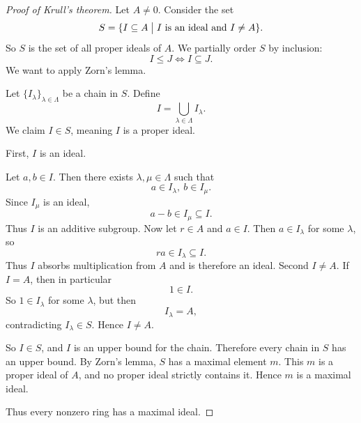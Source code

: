 \documentclass[11pt]{article}
\begin{document}
\begin{proof}[Proof of Krull's theorem]
    Let $A \neq 0$. Consider the set 
    \[
        S = \{I \subseteq A \bigm| I \ \text{is an ideal and} \ 
        I \neq A\}.
    \]
    So $S$ is the set of all proper ideals of $A$. 
    We partially order $S$ by inclusion: 
    \[
        I \leq J \Leftrightarrow I \subseteq J. 
    \]
    We want to apply Zorn's lemma. 

    Let $\{I_\lambda\}_{\lambda \in \Lambda}$ be a chain in 
    $S$. Define 
    \[
        I = \bigcup_{\lambda \in \Lambda} I_\lambda.
    \]
    We claim $I \in S$, meaning $I$ is a proper ideal. 

    First, $I$ is an ideal. 

    Let $a,b \in I$. Then there exists $\lambda, \mu \in \Lambda$ 
    such that 
    \[
        a \in I_\lambda, \ b \in I_\mu. 
    \]
    Since $I_\mu$ is an ideal, 
    \[
        a - b \in I_\mu \subseteq I. 
    \]
    Thus $I$ is an additive subgroup. 
    Now let $r \in A$ and $a \in I$. Then $a \in I_\lambda$ for 
    some $\lambda$, so 
    \[
        ra \in I_\lambda \subseteq I. 
    \]
    Thus $I$ absorbs multiplication from $A$ and is therefore 
    an ideal. Second $I \neq A$. 
    If $I = A$, then in particular 
    \[
        1 \in I.
    \]
    So $1 \in I_\lambda$ for some $\lambda$, but then 
    \[
        I_\lambda = A,
    \]
    contradicting $I_\lambda \in S$. Hence $I \neq A$. 

    So $I \in S$, and $I$ is an upper bound for the chain. 
    Therefore every chain in $S$ has an upper bound. 
    By Zorn's lemma, $S$ has a maximal element $m$. 
    This $m$ is a proper ideal of $A$, and no proper ideal 
    strictly contains it. Hence $m$ is a maximal ideal. 

    Thus every nonzero ring has a maximal ideal. 
\end{proof}
\end{document}
